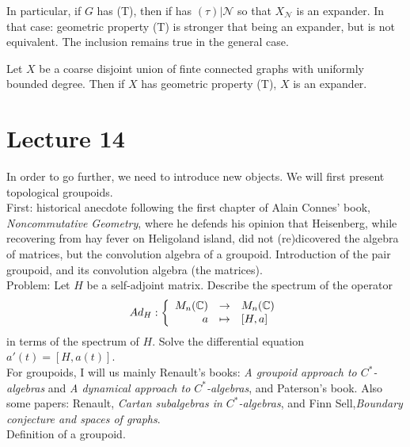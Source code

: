 In particular, if $G$ has (T), then if has $(\tau)|{\mathcal N}$ so that $X_{\mathcal N}$ is an expander. In that case: geometric property (T) is stronger that being an expander, but is not equivalent. The inclusion remains true in the general case.

\begin{thm}
Let $X$ be a coarse disjoint union of finte connected graphs with uniformly bounded degree. Then if $X$ has geometric property (T), $X$ is an expander.
\end{thm}

\section{Lecture 14}

In order to go further, we need to introduce new objects. We will first present topological groupoids.\\

First: historical anecdote following the first chapter of Alain Connes' book, \textit{Noncommutative Geometry}, where he defends his opinion that Heisenberg, while recovering from hay fever on Heligoland island, did not (re)dicovered the algebra of matrices, but the convolution algebra of a groupoid. Introduction of the pair groupoid, and its convolution algebra (the matrices).\\

Problem: Let $H$ be a self-adjoint matrix. Describe the spectrum of the operator
\[Ad_{H}:\left\{\begin{array}{rcl} M_n(\mathbb C) & \rightarrow & M_n(\mathbb C) \\ a & \mapsto & [H,a] \end{array}\right.\]
in terms of the spectrum of $H$. Solve the differential equation $a'(t) = [H,a(t)]$.\\

For groupoids, I will us mainly Renault's books: \textit{A groupoid approach to $C^*$-algebras} and \textit{A dynamical approach to $C^*$-algebras}, and Paterson's book. Also some papers: Renault, \textit{Cartan subalgebras in $C^*$-algebras}, and Finn Sell,\textit{Boundary conjecture and spaces of graphs}. \\

Definition of a groupoid.\\

